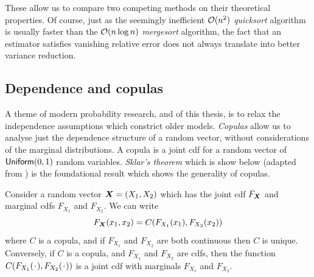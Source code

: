 These allow us to compare two competing methods on their theoretical properties. Of course, just as the seemingly inefficient ${\mathcal{O}}(n^2)$ \emph{quicksort} algorithm is usually faster than the ${\mathcal{O}}(n \log n)$ \emph{mergesort} algorithm, the fact that an estimator satisfies vanishing relative error does not always translate into better variance reduction.



\subsection{Dependence and copulas}

A theme of modern probability research, and of this thesis, is to relax the independence assumptions which constrict older models. \emph{Copulas} allow us to analyse just the dependence structure of a random vector, without considerations of the marginal distributions. A copula is a joint cdf for a random vector of $\mathsf{Uniform}(0,1)$ random variables. \emph{Sklar's theorem} which is show below (adapted from \cite{nelsen2006introduction}) is the foundational result which shows the generality of copulas.

\begin{theorem}

Consider a random vector $\bm{X}=(X_1,X_2)$ which has the joint cdf $F_{\bm{X}}$ and marginal cdfs $F_{X_1}$ and $F_{X_2}$. We can write
\begin{equation} \label{copula_def}
F_{\bm{X}}(x_1, x_2) = C( F_{X_1}(x_1), F_{X_2}(x_2) )
\end{equation}
where $C$ is a copula, and if $F_{X_1}$ and $F_{X_2}$ are both continuous then $C$ is unique. Conversely, if $C$ is a copula, and $F_{X_1}$ and $F_{X_2}$ are cdfs, then the function $ C( F_{X_1}(\argdot), F_{X_2}(\argdot) )$ is a joint cdf with marginals $F_{X_1}$ and $F_{X_2}$.

\end{theorem}

